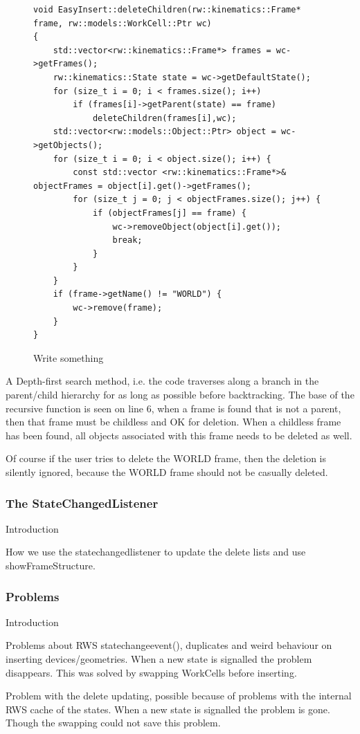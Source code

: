 \begin{figure}[h] %
\centering
\lstset{language=C++} 
\begin{lstlisting}[frame=single]  
void EasyInsert::deleteChildren(rw::kinematics::Frame* frame, rw::models::WorkCell::Ptr wc)
{
    std::vector<rw::kinematics::Frame*> frames = wc->getFrames();
    rw::kinematics::State state = wc->getDefaultState();
    for (size_t i = 0; i < frames.size(); i++)
        if (frames[i]->getParent(state) == frame)
            deleteChildren(frames[i],wc);
    std::vector<rw::models::Object::Ptr> object = wc->getObjects();
    for (size_t i = 0; i < object.size(); i++) {
        const std::vector <rw::kinematics::Frame*>& objectFrames = object[i].get()->getFrames();
        for (size_t j = 0; j < objectFrames.size(); j++) {
            if (objectFrames[j] == frame) {
                wc->removeObject(object[i].get());
                break;
            }
        }
    }
    if (frame->getName() != "WORLD") {
        wc->remove(frame);
    }
}
\end{lstlisting}
\caption{Write something}
\label{fig:eiDeleteChildren} 	
\end{figure}


A Depth-first search method, i.e. the code traverses along a branch in the parent/child hierarchy for as long as possible before backtracking. 
The base of the recursive function is seen on line 6, when a frame is found that is not a parent, then that frame must be childless and OK for deletion.
When a childless frame has been found, all objects associated with this frame needs to be deleted as well. 

Of course if the user tries to delete the WORLD frame, then the deletion is silently ignored, because the WORLD frame should not be casually deleted.

\subsubsection{The StateChangedListener}
\label{sec:eiStateChangedListener}
Introduction

How we use the statechangedlistener to update the delete lists and use showFrameStructure.



\subsubsection{Problems}
\label{sec:eiProblems}
Introduction

Problems about RWS statechangeevent(), duplicates and weird behaviour on inserting devices/geometries. When a new state is signalled the problem disappears. This was solved by swapping WorkCells before inserting.

Problem with the delete updating, possible because of problems with the internal RWS cache of the states. When a new state is signalled the problem is gone. Though the swapping could not save this problem.




